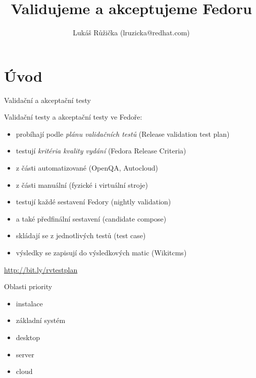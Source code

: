 \documentclass[12pt,aspectratio=169]{beamer}
\begin{document}
	\author{Lukáš Růžička (lruzicka@redhat.com)}
	\title{Validujeme a akceptujeme Fedoru}
	\date{}

\begin{frame}[plain]
	\maketitle 
\end{frame}

\section{Úvod}

\begin{frame}{Validační a akceptační testy}

Validační testy a akceptační testy ve Fedoře:

\vspace{15pt}

\begin{itemize}
\item probíhají podle \textit{plánu validačních testů} (Release validation test plan)
\item testují \textit{kritéria kvality vydání} (Fedora Release Criteria)
\item z části automatizované (OpenQA, Autocloud)
\item z části manuální (fyzické i virtuální stroje)
\item testují každé sestavení Fedory (nightly validation)
\item a také předfinální sestavení (candidate compose)
\item skládají se z jednotlivých testů (test case)
\item výsledky se zapisují do výsledkových matic (Wikitcms)
\end{itemize}

\vspace{15pt}

{\small \url{http://bit.ly/rvtestplan}}
\end{frame}

\begin{frame}{Oblasti priority}
	
	\begin{itemize}
		\item instalace
		\item základní systém
		\item desktop
		\item server
		\item cloud
	\end{itemize}
\end{frame}
\end{document}
